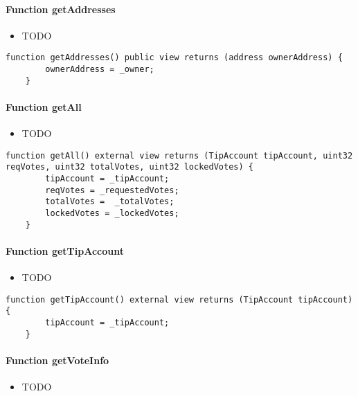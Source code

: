 \paragraph{Function getAddresses}

\begin{itemize}
\item TODO
\end{itemize}

\begin{lstlisting}[firstnumber=224]
    function getAddresses() public view returns (address ownerAddress) {
        ownerAddress = _owner;
    }
\end{lstlisting}

\paragraph{Function getAll}

\begin{itemize}
\item TODO
\end{itemize}

\begin{lstlisting}[firstnumber=207]
    function getAll() external view returns (TipAccount tipAccount, uint32 reqVotes, uint32 totalVotes, uint32 lockedVotes) {
        tipAccount = _tipAccount;
        reqVotes = _requestedVotes;
        totalVotes =  _totalVotes;
        lockedVotes = _lockedVotes;
    }
\end{lstlisting}

\paragraph{Function getTipAccount}

\begin{itemize}
\item TODO
\end{itemize}

\begin{lstlisting}[firstnumber=214]
    function getTipAccount() external view returns (TipAccount tipAccount) {
        tipAccount = _tipAccount;
    }
\end{lstlisting}

\paragraph{Function getVoteInfo}

\begin{itemize}
\item TODO
\end{itemize}

